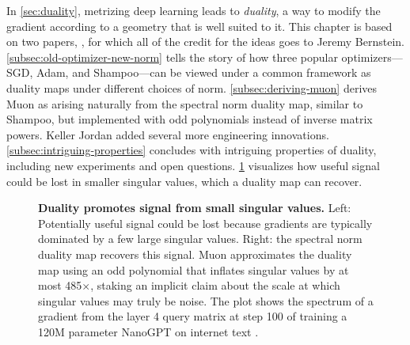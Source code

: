 In \cref{sec:duality}, metrizing deep learning leads to \textit{duality}, a way to modify the gradient according to a geometry that is well suited to it. This chapter is based on two papers, \citet{bernstein2024anthology,bernstein2024duality}, for which all of the credit for the ideas goes to Jeremy Bernstein. \cref{subsec:old-optimizer-new-norm} tells the story of how three popular optimizers---SGD, Adam, and Shampoo---can be viewed under a common framework as duality maps under different choices of norm. \cref{subsec:deriving-muon} derives Muon as arising naturally from the spectral norm duality map, similar to Shampoo, but implemented with odd polynomials instead of inverse matrix powers. Keller Jordan added several more engineering innovations. \cref{subsec:intriguing-properties} concludes with intriguing properties of duality, including new experiments and open questions. \cref{fig:gradient-spectrum} visualizes how useful signal could be lost in smaller singular values, which a duality map can recover.

\begin{figure}[t]
    \centering
    \subfloat{
        
    }
    \hspace{0.03\textwidth}
    \subfloat{
        
    }
    \caption{\textbf{Duality promotes signal from small singular values.} Left: Potentially useful signal could be lost because gradients are typically dominated by a few large singular values. Right: the spectral norm duality map recovers this signal. Muon \citep{jordan2024muon} approximates the duality map using an odd polynomial that inflates singular values by at most 485$\times$, staking an implicit claim about the scale at which singular values may truly be noise. The plot shows the spectrum of a gradient from the layer 4 query matrix at step 100 of training a 120M parameter NanoGPT on internet text \citep{karpathy_nanoGPT}. }
    \label{fig:gradient-spectrum}
\end{figure}

